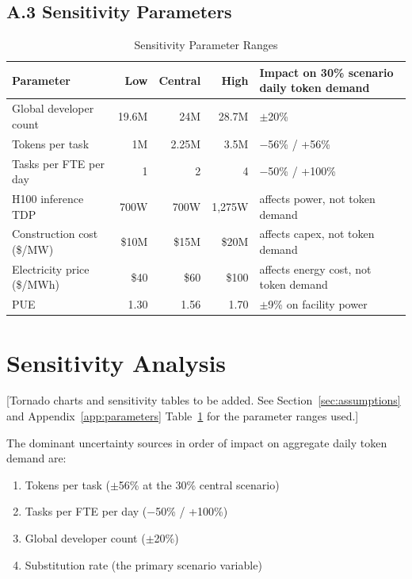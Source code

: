 \documentclass{article}
\begin{document}
\subsection*{A.3 Sensitivity Parameters}

\begin{table}[ht]
\centering
\caption{Sensitivity Parameter Ranges}
\label{tab:sensitivity-params}
\small
\begin{tabular}{@{}p{4.5cm}rrr p{4.5cm}@{}}
\toprule
\textbf{Parameter} & \textbf{Low} & \textbf{Central} & \textbf{High} & \textbf{Impact on 30\% scenario daily token demand} \\
\midrule
Global developer count & 19.6M & 24M & 28.7M & $\pm$20\% \\
Tokens per task & 1M & 2.25M & 3.5M & $-$56\% / +56\% \\
Tasks per FTE per day & 1 & 2 & 4 & $-$50\% / +100\% \\
H100 inference TDP & 700W & 700W & 1,275W & affects power, not token demand \\
Construction cost (\$/MW) & \$10M & \$15M & \$20M & affects capex, not token demand \\
Electricity price (\$/MWh) & \$40 & \$60 & \$100 & affects energy cost, not token demand \\
PUE & 1.30 & 1.56 & 1.70 & $\pm$9\% on facility power \\
\bottomrule
\end{tabular}
\end{table}

\section{Sensitivity Analysis}
\label{app:sensitivity}

[Tornado charts and sensitivity tables to be added. See Section~\ref{sec:assumptions}
and Appendix~\ref{app:parameters} Table~\ref{tab:sensitivity-params} for the parameter
ranges used.]

The dominant uncertainty sources in order of impact on aggregate daily token demand are:
\begin{enumerate}
  \item Tokens per task ($\pm$56\% at the 30\% central scenario)
  \item Tasks per FTE per day ($-$50\% / +100\%)
  \item Global developer count ($\pm$20\%)
  \item Substitution rate (the primary scenario variable)
\end{enumerate}
\end{document}

